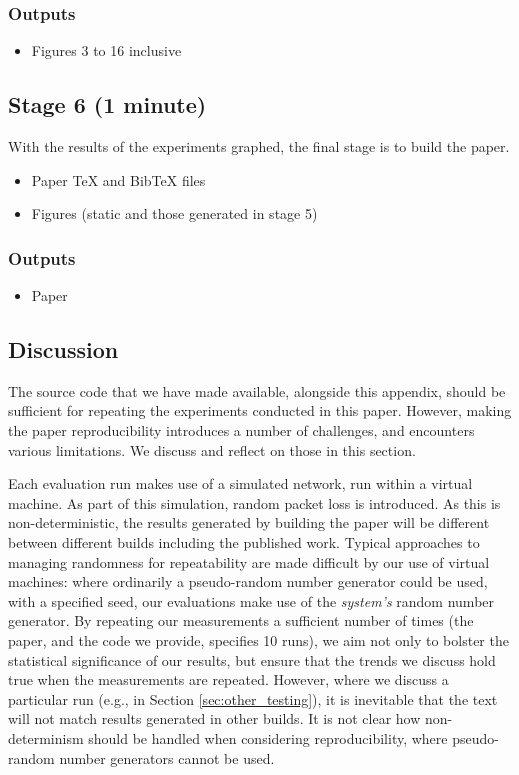 \documentclass[sigconf]{acmart}
\begin{document}
\subsubsection*{Outputs}

\begin{itemize}
\item Figures 3 to 16 inclusive
\end{itemize}

\subsection*{Stage 6 (1 minute)}
With the results of the experiments graphed, the final stage is to build the paper.

\begin{itemize}
\item Paper TeX and BibTeX files
\item Figures (static and those generated in stage 5)
\end{itemize}
\subsubsection*{Outputs}
\begin{itemize}
\item Paper
\end{itemize}

\subsection*{Discussion}

The source code that we have made available, alongside this appendix, should be sufficient
for repeating the experiments conducted in this paper. However, making the paper
reproducibility introduces a number of challenges, and encounters various limitations. We
discuss and reflect on those in this section.

Each evaluation run makes use of a simulated network, run within a virtual machine. As
part of this simulation, random packet loss is introduced. As this is non-deterministic,
the results generated by building the paper will be different between different builds
including the published work. Typical approaches to managing randomness for repeatability
are made difficult by our use of virtual machines: where ordinarily a pseudo-random
number generator could be used, with a specified seed, our evaluations make use of the
\emph{system's} random number generator. By repeating our measurements a sufficient
number of times (the paper, and the code we provide, specifies 10 runs), we aim not only
to bolster the statistical significance of our results, but ensure that the trends we
discuss hold true when the measurements are repeated. However, where we discuss a
particular run (e.g., in Section \ref{sec:other_testing}), it is inevitable that the text
will not match results generated in other builds. It is not clear how non-determinism
should be handled when considering reproducibility, where pseudo-random number generators
cannot be used.
\end{document}
